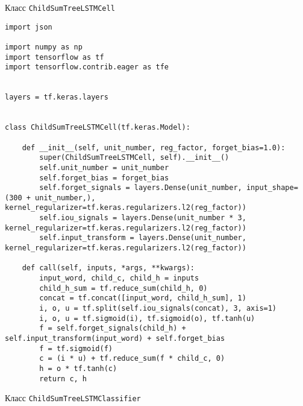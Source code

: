 \appendix


\begin{center}Класс \texttt{ChildSumTreeLSTMCell}\end{center}

\begin{lstlisting}[style=app]
import json

import numpy as np
import tensorflow as tf
import tensorflow.contrib.eager as tfe


layers = tf.keras.layers


class ChildSumTreeLSTMCell(tf.keras.Model):

    def __init__(self, unit_number, reg_factor, forget_bias=1.0):
        super(ChildSumTreeLSTMCell, self).__init__()
        self.unit_number = unit_number
        self.forget_bias = forget_bias
        self.forget_signals = layers.Dense(unit_number, input_shape=(300 + unit_number,), kernel_regularizer=tf.keras.regularizers.l2(reg_factor))
        self.iou_signals = layers.Dense(unit_number * 3, kernel_regularizer=tf.keras.regularizers.l2(reg_factor))
        self.input_transform = layers.Dense(unit_number, kernel_regularizer=tf.keras.regularizers.l2(reg_factor))

    def call(self, inputs, *args, **kwargs):
        input_word, child_c, child_h = inputs
        child_h_sum = tf.reduce_sum(child_h, 0)
        concat = tf.concat([input_word, child_h_sum], 1)
        i, o, u = tf.split(self.iou_signals(concat), 3, axis=1)
        i, o, u = tf.sigmoid(i), tf.sigmoid(o), tf.tanh(u)
        f = self.forget_signals(child_h) + self.input_transform(input_word) + self.forget_bias
        f = tf.sigmoid(f)
        c = (i * u) + tf.reduce_sum(f * child_c, 0)
        h = o * tf.tanh(c)
        return c, h
\end{lstlisting}

\begin{center}Класс \texttt{ChildSumTreeLSTMClassifier}\end{center}

